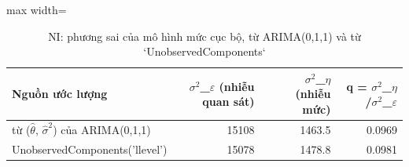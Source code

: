 \begin{table}[H]
\centering\small
\caption{NI: phương sai của mô hình mức cục bộ, từ ARIMA(0,1,1) và từ `UnobservedComponents`}\label{tab:tab_b12_07_local_level}
\begin{adjustbox}{max width=\linewidth}
\begin{tabular}{>{\raggedright\arraybackslash}p{}rrr}
\toprule
Nguồn ước lượng & $\sigma^{2}$\_$\varepsilon$ (nhiễu quan sát) & $\sigma^{2}$\_$\eta$ (nhiễu mức) & q = $\sigma^{2}$\_$\eta$/$\sigma^{2}$\_$\varepsilon$ \\
\midrule
từ ($\hat{\theta}$, $\hat{\sigma}^{2}$) của ARIMA(0,1,1) & 15108 & 1463.5 & 0.0969 \\
UnobservedComponents('llevel') & 15078 & 1478.8 & 0.0981 \\
\bottomrule
\end{tabular}
\end{adjustbox}
\end{table}
